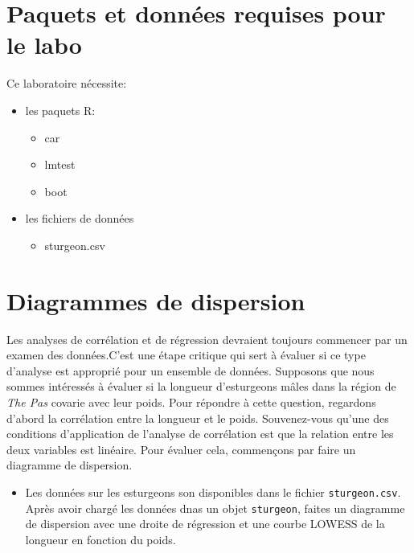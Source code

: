 \documentclass[12pt,]{book}
\providecommand{\tightlist}{%
  \setlength{\itemsep}{0pt}\setlength{\parskip}{0pt}}
\begin{document}
\hypertarget{set-lm}{%
\section{Paquets et données requises pour le labo}\label{set-lm}}

Ce laboratoire nécessite:

\begin{itemize}
\tightlist
\item
  les paquets R:

  \begin{itemize}
  \tightlist
  \item
    car
  \item
    lmtest
  \item
    boot
  \end{itemize}
\item
  les fichiers de données

  \begin{itemize}
  \tightlist
  \item
    sturgeon.csv
  \end{itemize}
\end{itemize}

\hypertarget{diagrammes-de-dispersion}{%
\section{Diagrammes de dispersion}\label{diagrammes-de-dispersion}}

Les analyses de corrélation et de régression devraient toujours commencer par un examen des données.C'est une étape critique qui sert à évaluer si ce type d'analyse est approprié pour un ensemble de données.
Supposons que nous sommes intéressés à évaluer si la longueur d'esturgeons mâles dans la région de \emph{The Pas} covarie avec leur poids.
Pour répondre à cette question, regardons d'abord la corrélation entre
la longueur et le poids.
Souvenez-vous qu'une des conditions d'application de l'analyse de
corrélation est que la relation entre les deux variables est linéaire. Pour
évaluer cela, commençons par faire un diagramme de dispersion.

\begin{itemize}
\tightlist
\item
  Les données sur les esturgeons son disponibles dans le fichier \texttt{sturgeon.csv}.
  Après avoir chargé les données dnas un objet \texttt{sturgeon}, faites un diagramme de dispersion avec une droite de régression et une courbe LOWESS de la longueur en fonction du poids.
\end{itemize}
\end{document}
